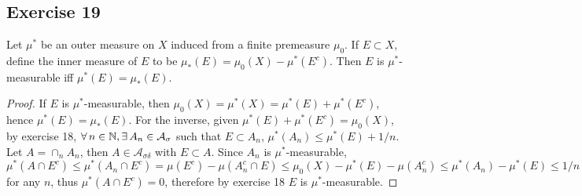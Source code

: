 \subsection*{Exercise 19}
Let $\mu^*$ be an outer measure on $X$ induced from a finite premeasure $\mu_0$. If $E\subset X$, define the inner measure of $E$ to be $\mu_*(E)=\mu_0(X)-\mu^*(E^c)$. Then $E$ is $\mu^*$-measurable iff $\mu^*(E)=\mu_*(E)$.
\begin{proof}
    If $E$ is $\mu^*$-measurable, then $\mu_0(X)=\mu^*(X)=\mu^*(E)+\mu^*(E^c)$, hence $\mu^*(E)=\mu_*(E)$. For the inverse, given $\mu^*(E)+\mu^*(E^c)=\mu_0(X)$, by exercise 18, $\forall\, n\in\mathbb{N}, \exists\, A_n\in\mathcal{A_\sigma}$ such that $E\subset A_n$, $\mu^*(A_n)\le\mu^*(E)+1/n$. Let $A=\cap_nA_n$, then $A\in\mathcal{A}_{\sigma\delta}$ with $E\subset A$. Since $A_n$ is $\mu^*$-measurable, $\mu^*(A\cap E^c)\le\mu^*(A_n\cap E^c)=\mu(E^c)-\mu(A_n^c\cap E)\le\mu_0(X)-\mu^*(E)-\mu(A_n^c)\le\mu^*(A_n)-\mu^*(E)\le1/n$ for any $n$, thus $\mu^*(A\cap E^c)=0$, therefore by exercise 18 $E$ is $\mu^*$-measurable.
\end{proof}
